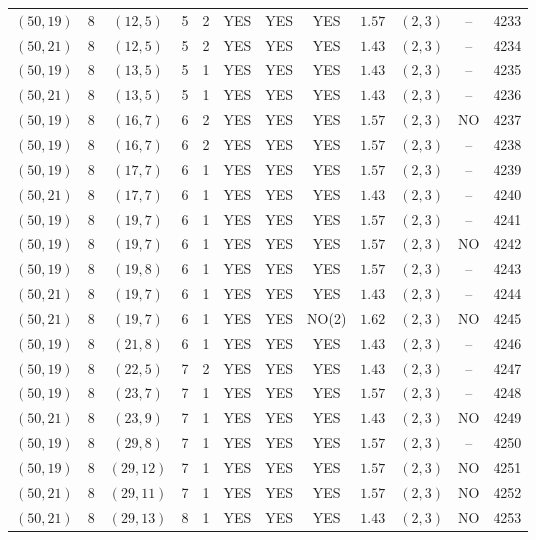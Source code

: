 \begin{longtable}{|c|c|c|c|c|c|c|c|c|c|c|c|}
$(50,19)$ & 8 & $(12,5)$ & 5 & 2 & YES & YES & YES & $1.57$ & $(2,3)$ & -- & 4233\\
$(50,21)$ & 8 & $(12,5)$ & 5 & 2 & YES & YES & YES & $1.43$ & $(2,3)$ & -- & 4234\\
$(50,19)$ & 8 & $(13,5)$ & 5 & 1 & YES & YES & YES & $1.43$ & $(2,3)$ & -- & 4235\\
$(50,21)$ & 8 & $(13,5)$ & 5 & 1 & YES & YES & YES & $1.43$ & $(2,3)$ & -- & 4236\\
$(50,19)$ & 8 & $(16,7)$ & 6 & 2 & YES & YES & YES & $1.57$ & $(2,3)$ & NO & 4237\\
$(50,19)$ & 8 & $(16,7)$ & 6 & 2 & YES & YES & YES & $1.57$ & $(2,3)$ & -- & 4238\\
$(50,19)$ & 8 & $(17,7)$ & 6 & 1 & YES & YES & YES & $1.57$ & $(2,3)$ & -- & 4239\\
$(50,21)$ & 8 & $(17,7)$ & 6 & 1 & YES & YES & YES & $1.43$ & $(2,3)$ & -- & 4240\\
$(50,19)$ & 8 & $(19,7)$ & 6 & 1 & YES & YES & YES & $1.57$ & $(2,3)$ & -- & 4241\\
$(50,19)$ & 8 & $(19,7)$ & 6 & 1 & YES & YES & YES & $1.57$ & $(2,3)$ & NO & 4242\\
$(50,19)$ & 8 & $(19,8)$ & 6 & 1 & YES & YES & YES & $1.57$ & $(2,3)$ & -- & 4243\\
$(50,21)$ & 8 & $(19,7)$ & 6 & 1 & YES & YES & YES & $1.43$ & $(2,3)$ & -- & 4244\\
$(50,21)$ & 8 & $(19,7)$ & 6 & 1 & YES & YES & NO(2) & $1.62$ & $(2,3)$ & NO & 4245\\
$(50,19)$ & 8 & $(21,8)$ & 6 & 1 & YES & YES & YES & $1.43$ & $(2,3)$ & -- & 4246\\
$(50,19)$ & 8 & $(22,5)$ & 7 & 2 & YES & YES & YES & $1.43$ & $(2,3)$ & -- & 4247\\
$(50,19)$ & 8 & $(23,7)$ & 7 & 1 & YES & YES & YES & $1.57$ & $(2,3)$ & -- & 4248\\
$(50,21)$ & 8 & $(23,9)$ & 7 & 1 & YES & YES & YES & $1.43$ & $(2,3)$ & NO & 4249\\
$(50,19)$ & 8 & $(29,8)$ & 7 & 1 & YES & YES & YES & $1.57$ & $(2,3)$ & -- & 4250\\
$(50,19)$ & 8 & $(29,12)$ & 7 & 1 & YES & YES & YES & $1.57$ & $(2,3)$ & NO & 4251\\
$(50,21)$ & 8 & $(29,11)$ & 7 & 1 & YES & YES & YES & $1.57$ & $(2,3)$ & NO & 4252\\
$(50,21)$ & 8 & $(29,13)$ & 8 & 1 & YES & YES & YES & $1.43$ & $(2,3)$ & NO & 4253\\

\end{longtable}
